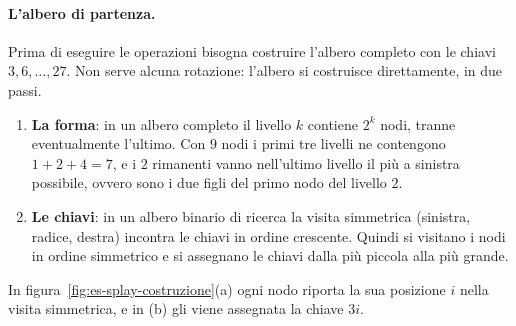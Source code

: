 \paragraph{L'albero di partenza.}
Prima di eseguire le operazioni bisogna costruire l'albero completo con le chiavi $3, 6, \dots, 27$. Non serve alcuna rotazione: l'albero si costruisce direttamente, in due passi.
\begin{enumerate}
    \item \textbf{La forma}: in un albero completo il livello $k$ contiene $2^k$ nodi, tranne eventualmente l'ultimo. Con $9$ nodi i primi tre livelli ne contengono $1 + 2 + 4 = 7$, e i $2$ rimanenti vanno nell'ultimo livello il più a sinistra possibile, ovvero sono i due figli del primo nodo del livello $2$.
    \item \textbf{Le chiavi}: in un albero binario di ricerca la visita simmetrica (sinistra, radice, destra) incontra le chiavi in ordine crescente. Quindi si visitano i nodi in ordine simmetrico e si assegnano le chiavi dalla più piccola alla più grande.
\end{enumerate}
In figura~\ref{fig:es-splay-costruzione}(a) ogni nodo riporta la sua posizione $i$ nella visita simmetrica, e in (b) gli viene assegnata la chiave $3i$.


